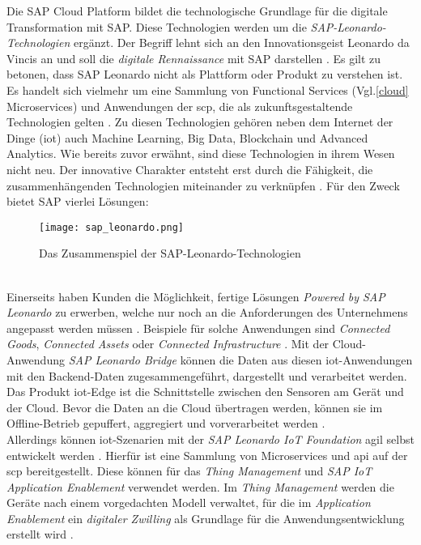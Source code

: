 Die SAP Cloud Platform bildet die technologische Grundlage für die digitale Transformation mit SAP. Diese Technologien werden um die \textit{SAP-Leonardo-Technologien} ergänzt. Der Begriff lehnt sich an den Innovationsgeist Leonardo da Vincis an und soll die \textit{digitale Rennaissance} mit SAP  darstellen \citep{Howells2017}. Es gilt zu betonen, dass SAP Leonardo nicht als Plattform oder Produkt zu verstehen ist. Es handelt sich vielmehr um eine Sammlung von Functional Services (Vgl.\ref{cloud} Microservices) und Anwendungen der \ac{scp}, die als zukunftsgestaltende Technologien gelten \citep{Elsner2018}. Zu diesen Technologien gehören neben dem Internet der Dinge (\acf{iot}) auch Machine Learning, Big Data, Blockchain und Advanced Analytics. Wie bereits zuvor erwähnt, sind diese Technologien in ihrem Wesen nicht neu. Der innovative Charakter entsteht erst durch die Fähigkeit, die zusammenhängenden Technologien miteinander zu verknüpfen \citep{Utecht2018}. Für den Zweck bietet SAP vierlei Lösungen:
\begin{figure}[ht]
  \centering
  \texttt{[image: sap\_leonardo.png]}
  \caption{Das Zusammenspiel der SAP-Leonardo-Technologien \citep[S. 87]{Elsner2018}}
\end{figure}
 \\Einerseits haben Kunden die Möglichkeit, fertige Lösungen \textit{Powered by SAP Leonardo} zu erwerben, welche nur noch an die Anforderungen des Unternehmens angepasst werden müssen \citep{Utecht2018}. Beispiele für solche Anwendungen sind \textit{Connected Goods}, \textit{Connected Assets} oder \textit{Connected Infrastructure} \citep{Elsner2018}. Mit der Cloud-Anwendung \textit{SAP Leonardo Bridge} können die Daten aus diesen \ac{iot}-Anwendungen mit den Backend-Daten zugesammengeführt, dargestellt und verarbeitet werden. Das Produkt \ac{iot}-Edge ist die Schnittstelle zwischen den Sensoren am Gerät und der Cloud. Bevor die Daten an die Cloud übertragen werden, können sie im Offline-Betrieb gepuffert, aggregiert und vorverarbeitet werden \citep{Utecht2018}.
\\Allerdings können \ac{iot}-Szenarien mit der \textit{SAP Leonardo IoT Foundation} agil selbst entwickelt werden \citep{Elsner2018}. Hierfür ist eine Sammlung von Microservices und \ac{api} auf der \ac{scp} bereitgestellt. Diese können für das \textit{Thing Management} und \textit{SAP IoT Application Enablement} verwendet werden. Im \textit{Thing Management} werden die Geräte nach einem vorgedachten Modell verwaltet, für die im \textit{Application Enablement} ein \textit{digitaler Zwilling} als Grundlage für die Anwendungsentwicklung erstellt wird \citep{Elsner2018}.
